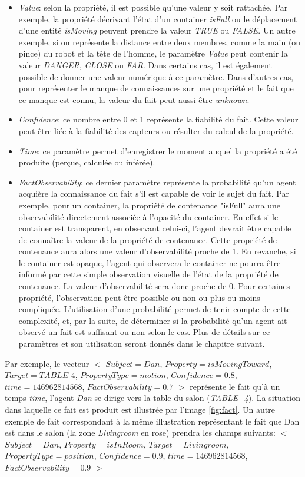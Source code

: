 \documentclass[a4paper,11pt,twoside]{StyleThese}
\begin{document}
\begin{itemize}
\item \textit{Value}: selon la propriété, il est possible qu'une valeur y soit rattachée. Par exemple, la propriété décrivant l'état d'un container \textit{isFull} ou le déplacement d'une entité \textit{isMoving} peuvent prendre la valeur \textit{TRUE} ou \textit{FALSE}. Un autre exemple, si on représente la distance entre deux membres, comme la main (ou pince) du robot et la tête de l'homme, le paramètre \textit{Value} peut contenir la valeur \textit{DANGER}, \textit{CLOSE} ou \textit{FAR}. Dans certains cas, il est également possible de donner une valeur numérique à ce paramètre.
Dans d'autres cas, pour représenter le manque de connaissances sur une propriété et le fait que ce manque est connu, la valeur du fait peut aussi être \textit{unknown}.
\item \textit{Confidence}: ce nombre entre 0 et 1 représente la fiabilité du fait. Cette valeur peut être liée à la fiabilité des capteurs ou résulter du calcul de la propriété.
\item \textit{Time}: ce paramètre permet d'enregistrer le moment auquel la propriété a été produite (perçue, calculée ou inférée).
\item \textit{FactObservability}: ce dernier paramètre représente la probabilité qu'un agent acquière la connaissance du fait s'il est capable de voir le sujet du fait. Par exemple, pour un container, la propriété de contenance "isFull" aura une observabilité directement associée à l'opacité du container. En effet si le container est transparent, en observant celui-ci, l'agent devrait être capable de connaître la valeur de la propriété de contenance. Cette propriété de contenance aura alors une valeur d'observabilité proche de 1. En revanche, si le container est opaque, l'agent qui observera le container ne pourra être informé par cette simple observation visuelle de l'état de la propriété de contenance. La valeur d'observabilité sera donc proche de 0. Pour certaines propriété, l'observation peut être possible ou non ou plus ou moins compliquée. L'utilisation d'une probabilité permet de tenir compte de cette complexité, et, par la suite, de déterminer si la probabilité qu'un agent ait observé un fait est suffisant ou non selon le cas. Plus de détails sur ce paramètres et son utilisation seront donnés dans le chapitre suivant.
\end{itemize}

Par exemple, le vecteur 
$<$ $Subject = Dan$, $Property = isMovingToward$, $Target = TABLE\_4$, $PropertyType = motion$, $Confidence = 0.8$, $time = 146962814568$, $FactObservability = 0.7$ $>$ représente le fait qu'à un temps \textit{time}, l'agent \textit{Dan} se dirige vers la table du salon (\textit{TABLE\_4}). La situation dans laquelle ce fait est produit est illustrée par l'image \ref{fig:fact}.
Un autre exemple de fait correspondant à la même illustration représentant le fait que Dan est dans le salon (la zone \textit{Livingroom} en rose) prendra les champs suivants:
$<$ $Subject = Dan$, $Property = isInRoom$, $Target = Livingroom$, $PropertyType = position$, $Confidence = 0.9$, $time = 146962814568$, $FactObservability = 0.9$ $>$
\end{document}
